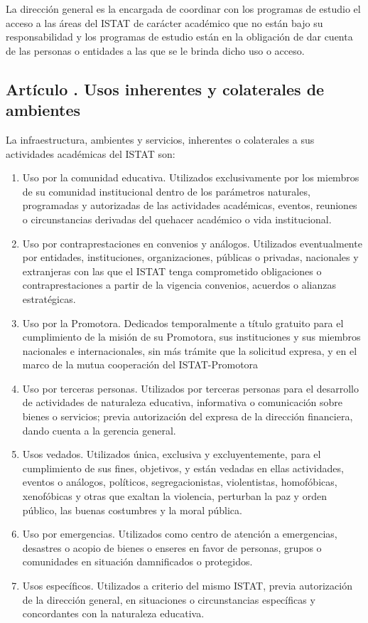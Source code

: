 La dirección general es la encargada de coordinar con los programas de estudio el acceso a las áreas del ISTAT de carácter académico que no están bajo su responsabilidad y los programas de estudio están en la obligación de dar cuenta de las personas o entidades a las que se le brinda dicho uso o acceso.
\subsection{Artículo . Usos inherentes y colaterales de ambientes}
\addtocounter{ns}{1}
La infraestructura, ambientes y servicios, inherentes o colaterales a sus actividades académicas del ISTAT son: 
\begin{enumerate}
\item Uso por la comunidad educativa. Utilizados exclusivamente por los miembros de su comunidad institucional dentro de los parámetros naturales, programadas y autorizadas de las actividades académicas, eventos, reuniones o circunstancias derivadas del quehacer académico o vida institucional. 
\item Uso por contraprestaciones en convenios y análogos. Utilizados eventualmente por entidades, instituciones, organizaciones, públicas o privadas, nacionales y extranjeras con las que el ISTAT tenga comprometido obligaciones o contraprestaciones a partir de la vigencia convenios, acuerdos o alianzas estratégicas. 
\item Uso por la Promotora. Dedicados temporalmente a título gratuito para el cumplimiento de la misión de su Promotora, sus instituciones y sus miembros nacionales e internacionales, sin más trámite que la solicitud expresa, y en el marco de la mutua cooperación del ISTAT-Promotora 
\item Uso por terceras personas. Utilizados por terceras personas para el desarrollo de actividades de naturaleza educativa, informativa o comunicación sobre bienes o servicios; previa autorización del expresa de la dirección financiera, dando cuenta a la gerencia general. 
\item Usos vedados. Utilizados única, exclusiva y excluyentemente, para el cumplimiento de sus fines, objetivos, y están vedadas en ellas actividades, eventos o análogos, políticos, segregacionistas, violentistas, homofóbicas, xenofóbicas y otras que exaltan la violencia, perturban la paz y orden público, las buenas costumbres y la moral pública. 
\item Uso por emergencias. Utilizados como centro de atención a emergencias, desastres o acopio de bienes o enseres en favor de personas, grupos o comunidades en situación damnificados o protegidos. 
\item Usos específicos. Utilizados a criterio del mismo ISTAT, previa autorización de la dirección general, en situaciones o circunstancias específicas y concordantes con la naturaleza educativa.
\end{enumerate}
